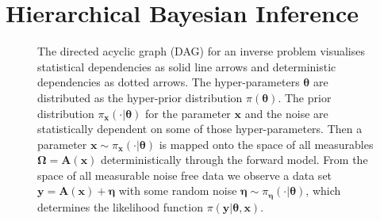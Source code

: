 \section{Hierarchical Bayesian Inference}
\label{sec:bayes}
\begin{figure}[ht!]
	\centering
	\caption[Hierarchical Bayesian Inference]{The directed acyclic graph (DAG) for an inverse problem visualises statistical dependencies as solid line arrows and deterministic dependencies as dotted arrows.
		The hyper-parameters $\bm{\theta}$ are distributed as the hyper-prior distribution $\pi(\bm{\theta})$.
		The prior distribution $ \pi_{\bm{x}}(\cdot|\bm{\theta})$ for the parameter $\bm{x}$ and the noise are statistically dependent on some of those hyper-parameters.
		Then a parameter $\bm{x} \sim \pi_{\bm{x}}(\cdot|\bm{\theta})$ is mapped onto the space of all measurables $\bm{\Omega}=\bm{A}(\bm{x})$ deterministically through the forward model.
		From the space of all measurable noise free data we observe a data set $\bm{y} = \bm{A}(\bm{x}) + \bm{\eta}$ with some random noise $ \bm{\eta} \sim \pi_{\bm{\eta}}(\cdot|\bm{\theta})$, which determines the likelihood function $\pi(\bm{y}|\bm{\theta}, \bm{x})$. }
	\label{fig:FirstDAG}
\end{figure}



